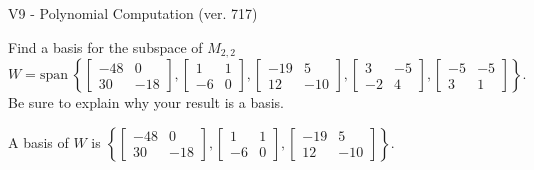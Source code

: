 \begin{exercise}
  \begin{exerciseTitle}V9 - Polynomial Computation (ver. 717)\end{exerciseTitle}
  \begin{exerciseStatement}
    Find a basis for the subspace of \(M_{2,2}\) 
\[W=\mathrm{span}\ \left\{\left[\begin{array}{cc}
-48 & 0 \\
30 & -18
\end{array}\right] , \left[\begin{array}{cc}
1 & 1 \\
-6 & 0
\end{array}\right] , \left[\begin{array}{cc}
-19 & 5 \\
12 & -10
\end{array}\right] , \left[\begin{array}{cc}
3 & -5 \\
-2 & 4
\end{array}\right] , \left[\begin{array}{cc}
-5 & -5 \\
3 & 1
\end{array}\right]\right\}.\]
 Be sure to explain why your result is a basis.


  \end{exerciseStatement}
  \begin{exerciseAnswer}
   A basis of \(W\) is  \(\left\{\left[\begin{array}{cc}
-48 & 0 \\
30 & -18
\end{array}\right] , \left[\begin{array}{cc}
1 & 1 \\
-6 & 0
\end{array}\right] , \left[\begin{array}{cc}
-19 & 5 \\
12 & -10
\end{array}\right]\right\}\).
  


  \end{exerciseAnswer}
\end{exercise}